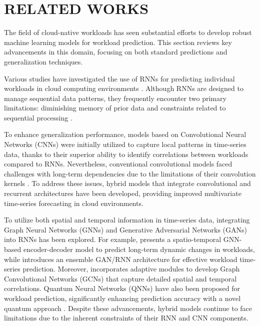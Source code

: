 \section{RELATED WORKS}
\label{sec: related works}

The field of cloud-native workloads has seen substantial efforts to develop robust machine learning models for workload prediction. This section reviews key advancements in this domain, focusing on both standard predictions and generalization techniques.

Various studies have investigated the use of RNNs for predicting individual workloads in cloud computing environments \cite{yuan2024improved, saxena2023performance}. Although RNNs are designed to manage sequential data patterns, they frequently encounter two primary limitations: diminishing memory of prior data and constraints related to sequential processing \cite{hochreiter1998vanishing, benidis2022deep}.

To enhance generalization performance, models based on Convolutional Neural Networks (CNNs) \cite{LSTNet, RPTCN} were initially utilized to capture local patterns in time-series data, thanks to their superior ability to identify correlations between workloads compared to RNNs. Nevertheless, conventional convolutional models faced challenges with long-term dependencies due to the limitations of their convolution kernels \cite{acmtimeseriesreview2024}. To address these issues, hybrid models that integrate convolutional and recurrent architectures \cite{xu2022esdnn} have been developed, providing improved multivariate time-series forecasting in cloud environments.

To utilize both spatial and temporal information in time-series data, integrating Graph Neural Networks (GNNs) and Generative Adversarial Networks (GANs) into RNNs has been explored. For example, \cite{li2024evogwp} presents a spatio-temporal GNN-based encoder-decoder model to predict long-term dynamic changes in workloads, while \cite{RNNGAN} introduces an ensemble GAN/RNN architecture for effective workload time-series prediction. Moreover, \cite{AGCRN} incorporates adaptive modules to develop Graph Convolutional Networks (GCNs) that capture detailed spatial and temporal correlations. Quantum Neural Networks (QNNs) have also been proposed for workload prediction, significantly enhancing prediction accuracy with a novel quantum approach \cite{10531701}. Despite these advancements, hybrid models continue to face limitations due to the inherent constraints of their RNN and CNN components.

